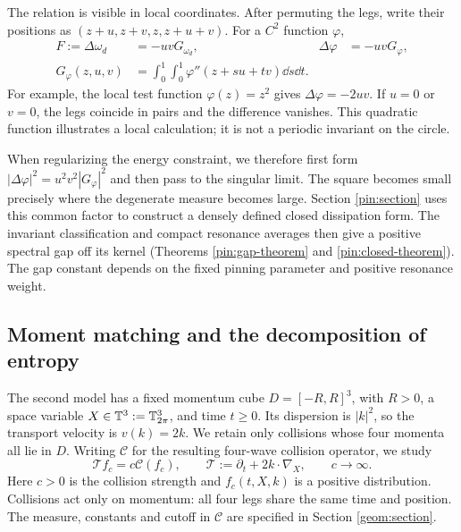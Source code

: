 The relation is visible in local coordinates. After permuting the legs,
write their positions as $(z+u,z+v,z,z+u+v)$. For a $C^2$ function $\varphi$,
\begin{equation}\label{intro:common-factor}
 \begin{aligned}
 F:=\Delta\omega_d&=-uvG_{\omega_d},&
 \Delta\varphi&=-uvG_\varphi,\\
 G_\varphi(z,u,v)&=\int_0^1\int_0^1
       \varphi''(z+su+tv)\dd s\dd t.
 \end{aligned}
\end{equation}
For example, the local test function $\varphi(z)=z^2$ gives
$\Delta\varphi=-2uv$. If $u=0$ or $v=0$, the legs coincide in pairs and
the difference vanishes. This quadratic function illustrates a local
calculation; it is not a periodic invariant on the circle.

When regularizing the energy constraint, we therefore first form
$|\Delta\varphi|^2=u^2v^2|G_\varphi|^2$ and then pass to the singular limit.
The square becomes small precisely where the degenerate measure becomes
large. Section \ref{pin:section} uses this common factor to construct a
densely defined closed dissipation form. The invariant classification
and compact resonance averages then give a positive spectral gap off
its kernel (Theorems \ref{pin:gap-theorem} and \ref{pin:closed-theorem}).
The gap constant depends on the fixed pinning parameter and positive
resonance weight.

\subsection{Moment matching and the decomposition of entropy}
\label{intro:entropy-spine}

The second model has a fixed momentum cube $D=[-R,R]^3$, with
$R>0$, a space variable $X\in\mathbb T^3:=\mathbb T_{2\pi}^3$, and time $t\ge0$.
Its dispersion is $|k|^2$, so the transport velocity is $v(k)=2k$.
We retain only collisions whose four momenta all lie in $D$.
Writing $\mathcal C$ for the resulting four-wave collision operator,
we study
\begin{equation}\label{intro:wke}
 \mathcal T f_c=c\mathcal C(f_c),\qquad
 \mathcal T:=\partial_t+2k\cdot\nabla_X,\qquad c\longrightarrow\infty.
\end{equation}
Here $c>0$ is the collision strength and $f_c(t,X,k)$ is a positive
distribution. Collisions act only on momentum: all four legs share the
same time and position. The measure, constants and cutoff in
$\mathcal C$ are specified in Section \ref{geom:section}.


